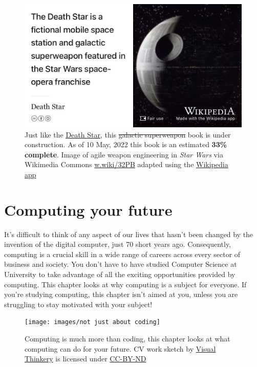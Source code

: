 \documentclass[
]{book}
\begin{document}
\begin{figure}

{\centering \includegraphics[width=0.99\linewidth]{images/DeathStar2} 

}

\caption{Just like the \href{https://en.wikipedia.org/wiki/Death_Star}{Death Star}, this \sout{galactic superweapon} book is under construction. As of 10 May, 2022 this book is an estimated \textbf{33\% complete}. Image of agile weapon engineering in \emph{Star Wars} via Wikimedia Commons \href{https://w.wiki/32PB}{w.wiki/32PB} adapted using the \href{https://apps.apple.com/gb/app/wikipedia/id324715238}{Wikipedia app}}\label{fig:deathstar2-fig}
\end{figure}

\hypertarget{computing}{%
\chapter{Computing your future}\label{computing}}

It's difficult to think of any aspect of our lives that hasn't been changed by the invention of the digital computer, just 70 short years ago. Consequently, computing is a crucial skill in a wide range of careers across every sector of business and society. You don't have to have studied Computer Science at University to take advantage of all the exciting opportunities provided by computing. This chapter looks at why computing is a subject for everyone. If you're studying computing, this chapter isn't aimed at you, unless you are struggling to stay motivated with your subject! 👨🏿‍💻👨‍💻👩🏽‍💻👩‍💻👨🏿‍💻

\begin{figure}

{\centering \texttt{[image: images/not just about coding]} 

}

\caption{Computing is much more than coding, this chapter looks at what computing can do for your future. CV work sketch by \href{https://visualthinkery.com}{Visual Thinkery} is licensed under \href{https://creativecommons.org/licenses/by-nd/4.0/}{CC-BY-ND}}\label{fig:not-coding-fig}
\end{figure}
\end{document}
